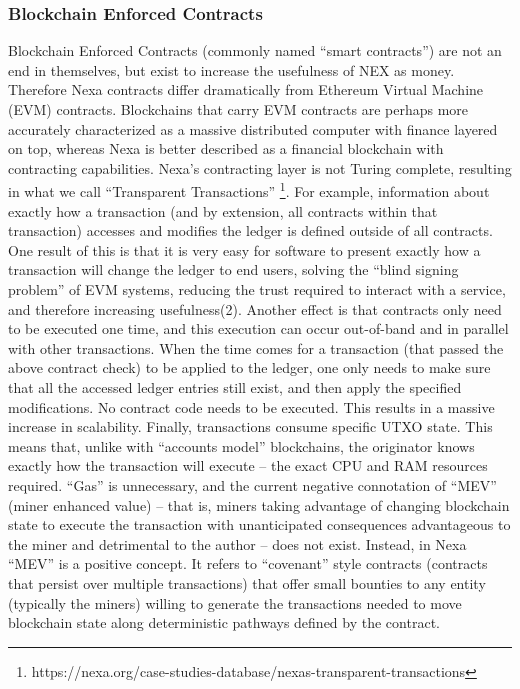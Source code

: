 \documentclass[a4paper, 11pt]{article}
\begin{document}
\subsubsection{Blockchain Enforced Contracts}
Blockchain Enforced Contracts (commonly named “smart contracts”) are not an end in themselves, but exist to increase the usefulness of NEX as money.  Therefore Nexa contracts differ dramatically from Ethereum Virtual Machine (EVM) contracts.  Blockchains that carry EVM contracts are perhaps more accurately characterized as a massive distributed computer with finance layered on top, whereas Nexa is better described as a financial blockchain with contracting capabilities.
Nexa’s contracting layer is not Turing complete, resulting in what we call “Transparent Transactions” \footnote{https://nexa.org/case-studies-database/nexas-transparent-transactions
}.  For example, information about exactly how a transaction (and by extension, all contracts within that transaction) accesses and modifies the ledger is defined outside of all contracts.  One result of this is that it is very easy for software to present exactly how a transaction will change the ledger to end users, solving the “blind signing problem” of EVM systems, reducing the trust required to interact with a service, and therefore increasing usefulness(2).  
Another effect is that contracts only need to be executed one time, and this execution can occur out-of-band and in parallel with other transactions.  When the time comes for a transaction (that passed the above contract check) to be applied to the ledger, one only needs to make sure that all the accessed ledger entries still exist, and then apply the specified modifications.  No contract code needs to be executed.  This results in a massive increase in scalability.
Finally, transactions consume specific UTXO state.  This means that, unlike with “accounts model” blockchains, the originator knows exactly how the transaction will execute – the exact CPU and RAM resources required.  “Gas” is unnecessary, and the current negative connotation of “MEV” (miner enhanced value) – that is, miners taking advantage of changing blockchain state to execute the transaction with unanticipated consequences advantageous to the miner and detrimental to the author – does not exist.  Instead, in Nexa “MEV” is a positive concept. It refers to “covenant” style contracts (contracts that persist over multiple transactions) that offer small bounties to any entity (typically the miners) willing to generate the transactions needed to move blockchain state along deterministic pathways defined by the contract.
\end{document}

